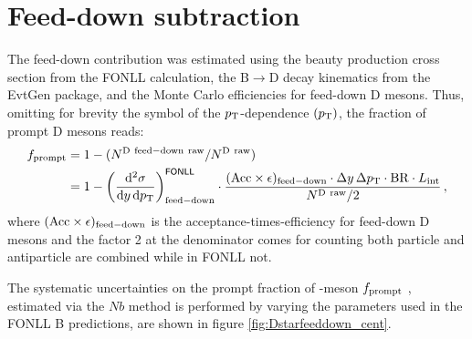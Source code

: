 \section{Feed-down subtraction}

The feed-down contribution was estimated using 
the beauty production cross section from the FONLL calculation,
the B$\rightarrow$D decay kinematics from the EvtGen package,
and the Monte Carlo efficiencies for feed-down D mesons. 
Thus, omitting for brevity the symbol of the $p_{\rm T}$-dependence $(p_{\rm T})$, 
the fraction of prompt D mesons reads:
\begin{equation}
 \label{eq:fcNbMethod}
 \begin{split}
   f_{\rm prompt} &= 1-(N^{\rm D~feed-down~raw}/N^{\rm D~raw})\\
   &= 1 -  \left( \frac{{\rm d}^2 \sigma}{{\rm d}y \, {\rm d}p_{\rm T} }
\right)^{{\sf FONLL}} _{{\rm feed-down}} \cdot
\frac{({\rm Acc}\times\epsilon)_{\rm feed-down}\cdot\Delta y \, \Delta p_{\rm T}
\cdot {\rm BR} \cdot L_{\rm int}  }{ N^{\rm D~raw }  / 2} \, ,
 \end{split}
\end{equation}
where $({\rm Acc}\times\epsilon)_{{\rm feed-down}}$ is the 
acceptance-times-efficiency for feed-down D mesons and the factor 2 at the denominator
comes for counting both particle and antiparticle
are combined while in FONLL not.

The systematic uncertainties on the prompt fraction of \Dstar -meson $f_{\rm prompt}$ , estimated via the $Nb$ method is performed by varying the parameters used in the FONLL B predictions, are shown in figure \ref{fig:Dstarfeeddown_cent}.

